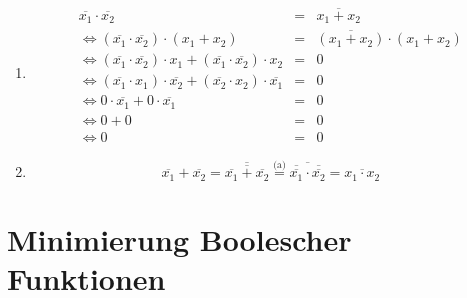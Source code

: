 \documentclass[DIN, pagenumber=false, fontsize=11pt, parskip=half]{scrartcl}
\begin{document}
    \subsection{}
    \begin{enumerate}[label=(\alph*)]
        \item 
            \begin{eqnarray*}
                \overline{x_1} \cdot \overline{x_2} &=& \overline{x_1 + x_2}\\
                \Leftrightarrow (\overline{x_1} \cdot \overline{x_2}) \cdot (x_1 + x_2) &=& \overline{(x_1 + x_2)} \cdot  (x_1 + x_2)\\
                \Leftrightarrow (\overline{x_1} \cdot \overline{x_2}) \cdot x_1 +  (\overline{x_1} \cdot \overline{x_2}) \cdot x_2 &=& 0\\
                \Leftrightarrow (\overline{x_1} \cdot x_1) \cdot \overline{x_2} + (\overline{x_2} \cdot x_2)  \cdot \overline{x_1} &=& 0\\
                \Leftrightarrow 0 \cdot \overline{x_1} + 0 \cdot \overline{x_1} &=& 0\\
                \Leftrightarrow 0 + 0 &=& 0\\
                \Leftrightarrow 0 &=& 0
            \end{eqnarray*}
        \item
            \begin{equation*}
                \overline{x_1} + \overline{x_2} = \overline{\overline{\overline{x_1} + \overline{x_2}}} \stackrel{\text{(a)}}{=}
                \overline{\overline{\overline{x_1}} \cdot \overline{\overline{x_2}}} = \overline{x_1 \cdot x_2}
            \end{equation*}
    \end{enumerate}

    \section{Minimierung Boolescher Funktionen}
    \setcounter{subsection}{2}
\end{document}
